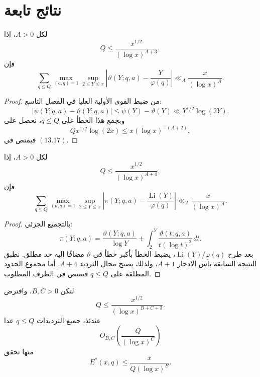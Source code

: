 \section{نتائج تابعة}

\begin{corollary}
\label{cor:chapter13-theta}
\provedhere
لكل \(A>0\)، إذا
\[
Q\le\frac{x^{1/2}}{(\log x)^{A+3}},
\]
فإن
\[
\sum_{q\le Q}
\max_{(a,q)=1}
\sup_{2\le Y\le x}
\left|
\vartheta(Y;q,a)-\frac{Y}{\varphi(q)}
\right|
\ll_A\frac{x}{(\log x)^A}.
\tag{13.21}
\]
\end{corollary}

\begin{proof}
من ضبط القوى الأولية العليا في الفصل التاسع:
\[
|\psi(Y;q,a)-\vartheta(Y;q,a)|
\le\psi(Y)-\vartheta(Y)
\ll Y^{1/2}\log(2Y).
\]
وبجمع هذا الخطأ على \(q\le Q\)، نحصل على
\[
Qx^{1/2}\log(2x)
\le x(\log x)^{-(A+2)},
\]
فيمتص في \((13.17)\).
\end{proof}

\begin{corollary}
\label{cor:chapter13-pi}
\provedhere
لكل \(A>0\)، إذا
\[
Q\le\frac{x^{1/2}}{(\log x)^{A+4}},
\]
فإن
\[
\sum_{q\le Q}
\max_{(a,q)=1}
\sup_{2\le Y\le x}
\left|
\pi(Y;q,a)-\frac{\operatorname{Li}(Y)}{\varphi(q)}
\right|
\ll_A\frac{x}{(\log x)^A}.
\tag{13.22}
\]
\end{corollary}

\begin{proof}
بالتجميع الجزئي:
\[
\pi(Y;q,a)
=
\frac{\vartheta(Y;q,a)}{\log Y}
+
\int_2^Y
\frac{\vartheta(t;q,a)}{t(\log t)^2}\,dt.
\]
بعد طرح \(\operatorname{Li}(Y)/\varphi(q)\)، يضبط الخطأ بأكبر خطأ في
\(\vartheta\) مضافًا إليه حد مطلق. نطبق النتيجة السابقة بأس الادخار
\(A+1\)، ولذلك يصبح مجال الترديد \(A+4\). أما مجموع الحدود المطلقة على
\(q\le Q\) فيمتص في الطرف المطلوب.
\end{proof}

\begin{corollary}
\label{cor:chapter13-almost-all-moduli}
\provedhere
لتكن \(B,C>0\)، وافترض
\[
Q\le\frac{x^{1/2}}{(\log x)^{B+C+3}}.
\]
عندئذ، جميع الترديدات \(q\le Q\) عدا
\[
O_{B,C}\left(\frac{Q}{(\log x)^C}\right)
\]
منها تحقق
\[
E^*(x,q)
\le
\frac{x}{Q(\log x)^B}.
\tag{13.23}
\]
\end{corollary}


